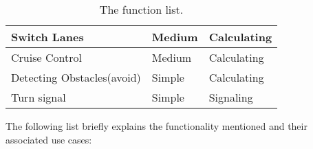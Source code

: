 \begin{table}[H]
\begin{tabular}{|l|l|l|}
Switch Lanes                                       & Medium     & Calculating  \\ \hline
Cruise Control                                     & Medium     & Calculating  \\ \hline
Detecting Obstacles(avoid)                         & Simple     & Calculating    \\ \hline
Turn signal                                        & Simple     & Signaling    \\ \hline
\end{tabular}
\caption{The function list.}
\label{functionlist}
\end{table}

The following list briefly explains the functionality mentioned and their associated use cases:
